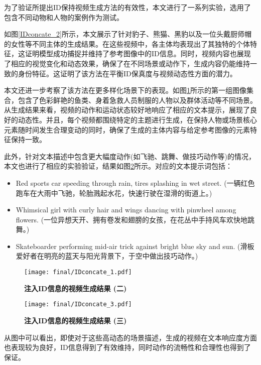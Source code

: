 为了验证所提出ID保持视频生成方法的有效性，本文进行了一系列实验，选用了包含不同动物和人物的案例作为测试。

如图\ref{IDconcate_2}所示，本文展示了针对豹子、熊猫、黑豹以及一位头戴厨师帽的女性等不同主体的生成结果。在这些视频中，各主体均表现出了其独特的个体特征，这证明模型成功捕捉并维持了参考图像中的ID信息。同时，视频内容也展现了相应的视觉变化和动态效果，确保了在不同场景或动作下，生成内容仍能维持一致的身份特征。这证明了该方法在平衡ID保真度与视频动态性方面的潜力。

本文还进一步考察了该方法在更多样化场景下的表现。如图\ref{IDconcate_1}所示的第一组图像集合，包含了色彩鲜艳的鱼类、身着急救人员制服的人物以及群体活动等不同场景。从生成结果来看，视频的动作和运动状态较好地响应了相应的文本提示，展现了良好的动态性。并且，每个视频都围绕特定的主题进行生成，在保持人物或场景核心元素随时间发生合理变动的同时，确保了生成的主体内容与给定参考图像的元素特征保持一致。

此外，针对文本描述中包含更大幅度动作(如飞驰、跳舞、做技巧动作等)的情况，本文也进行了相应的实验验证，结果如图\ref{IDconcate_3}所示。对应的文本提示词包括：

\begin{itemize}
\item Red sports car speeding through rain, tires splashing in wet street. (一辆红色跑车在大雨中飞驰，轮胎溅起水花，快速行驶在湿滑的街道上。)
\item Whimsical girl with curly hair and wings dancing with pinwheel among flowers. (一位异想天开、拥有卷发和翅膀的女孩，在花丛中手持风车欢快地跳舞。)
\item Skateboarder performing mid-air trick against bright blue sky and sun. (滑板爱好者在明亮的蓝天与阳光背景下，于空中做出技巧动作。)
\end{itemize}
\begin{figure}[htbp]
    \centering
    \texttt{[image: final/IDconcate\_1.pdf]}
    \caption{\textbf{注入ID信息的视频生成结果 (二)}}
    \label{IDconcate_1}
\end{figure}

\begin{figure}[htbp]
    \centering
    \texttt{[image: final/IDconcate\_3.pdf]}
    \caption{\textbf{注入ID信息的视频生成结果 (三)}}
    \label{IDconcate_3}
\end{figure}
从图中可以看出，即使对于这些高动态的场景描述，生成的视频在文本响应度方面也表现较为良好，ID信息得到了有效维持，同时动作的流畅性和合理性也得到了保证。

